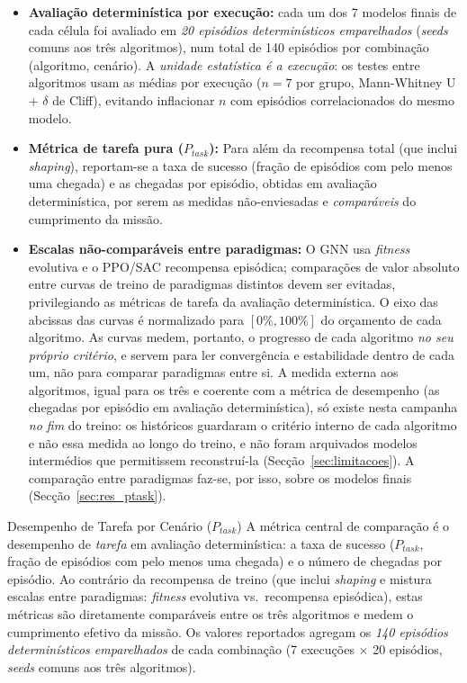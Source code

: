 \documentclass[12pt,reqno, twoside]{amsbook}
\makeatletter
\def\section{\@startsection{section}{1}%
      \z@{.5\linespacing\@plus.7\linespacing}{.25\linespacing}%
      {\normalfont\bfseries\flushleft}}
\theoremstyle{plain}
\numberwithin{equation}{chapter}
\numberwithin{section}{chapter}
\numberwithin{table}{chapter}
\numberwithin{figure}{chapter}
\makeatother
\begin{document}
\begin{itemize}
    \item \textbf{Avaliação determinística por execução:} cada um dos 7 modelos finais de cada célula foi avaliado em \emph{20 episódios determinísticos emparelhados} (\textit{seeds} comuns aos três algoritmos), num total de 140 episódios por combinação (algoritmo, cenário). A \emph{unidade estatística é a execução}: os testes entre algoritmos usam as médias por execução ($n=7$ por grupo, Mann-Whitney U + $\delta$ de Cliff), evitando inflacionar $n$ com episódios correlacionados do mesmo modelo.
    \item \textbf{Métrica de tarefa pura ($P_{task}$):} Para além da recompensa total (que inclui \textit{shaping}), reportam-se a taxa de sucesso (fração de episódios com pelo menos uma chegada) e as chegadas por episódio, obtidas em avaliação determinística, por serem as medidas não-enviesadas e \emph{comparáveis} do cumprimento da missão.
    \item \textbf{Escalas não-comparáveis entre paradigmas:} O GNN usa \textit{fitness} evolutiva e o PPO/SAC recompensa episódica; comparações de valor absoluto entre curvas de treino de paradigmas distintos devem ser evitadas, privilegiando as métricas de tarefa da avaliação determinística. O eixo das abcissas das curvas é normalizado para $[0\%, 100\%]$ do orçamento de cada algoritmo. As curvas medem, portanto, o progresso de cada algoritmo \emph{no seu próprio critério}, e servem para ler convergência e estabilidade dentro de cada um, não para comparar paradigmas entre si. A medida externa aos algoritmos, igual para os três e coerente com a métrica de desempenho (as chegadas por episódio em avaliação determinística), só existe nesta campanha \emph{no fim} do treino: os históricos guardaram o critério interno de cada algoritmo e não essa medida ao longo do treino, e não foram arquivados modelos intermédios que permitissem reconstruí-la (Secção~\ref{sec:limitacoes}). A comparação entre paradigmas faz-se, por isso, sobre os modelos finais (Secção~\ref{sec:res_ptask}).
\end{itemize}

\section{Desempenho de Tarefa por Cenário ($P_{task}$)}
\label{sec:res_ptask}
A métrica central de comparação é o desempenho de \emph{tarefa} em avaliação determinística: a taxa de sucesso ($P_{task}$, fração de episódios com pelo menos uma chegada) e o número de chegadas por episódio. Ao contrário da recompensa de treino (que inclui \textit{shaping} e mistura escalas entre paradigmas: \textit{fitness} evolutiva vs.\ recompensa episódica), estas métricas são diretamente comparáveis entre os três algoritmos e medem o cumprimento efetivo da missão. Os valores reportados agregam os \emph{140 episódios determinísticos emparelhados} de cada combinação (7 execuções $\times$ 20 episódios, \textit{seeds} comuns aos três algoritmos).
\end{document}
